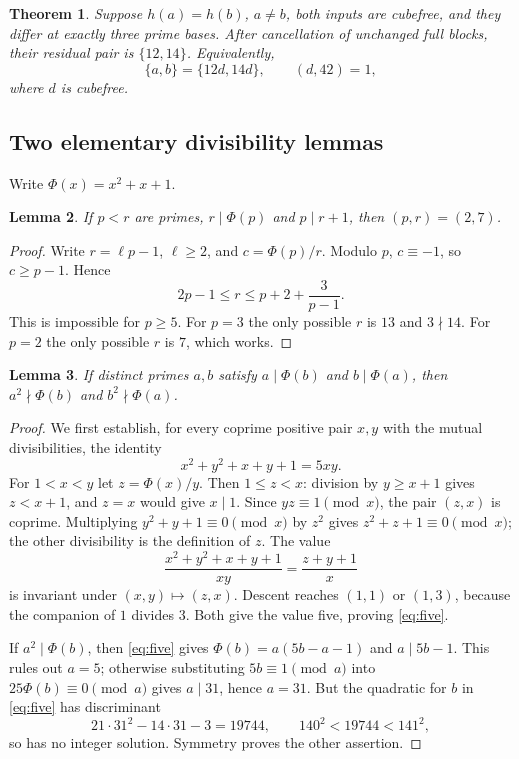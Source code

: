 \documentclass[11pt,a4paper]{article}
\newtheorem{theorem}{Theorem}[section]
\newtheorem{lemma}[theorem]{Lemma}
\theoremstyle{remark}
\begin{document}
\begin{theorem}\label{thm:three}
Suppose $h(a)=h(b)$, $a\ne b$, both inputs are cubefree, and they differ
at exactly three prime bases. After cancellation of unchanged full blocks,
their residual pair is $\{12,14\}$. Equivalently,
\[
 \{a,b\}=\{12d,14d\},\qquad (d,42)=1,
\]
where $d$ is cubefree.
\end{theorem}

\subsection{Two elementary divisibility lemmas}
Write $\Phi(x)=x^2+x+1$.
\begin{lemma}\label{lem:mixed}
If $p<r$ are primes, $r\mid\Phi(p)$ and $p\mid r+1$, then
$(p,r)=(2,7)$.
\end{lemma}
\begin{proof}
Write $r=\ell p-1$, $\ell\ge2$, and $c=\Phi(p)/r$.
Modulo $p$, $c\equiv-1$, so $c\ge p-1$. Hence
\[
 2p-1\le r\le p+2+\frac3{p-1}.
\]
This is impossible for $p\ge5$. For $p=3$ the only possible $r$ is $13$
and $3\nmid14$. For $p=2$ the only possible $r$ is $7$, which works.
\end{proof}

\begin{lemma}\label{lem:mutual}
If distinct primes $a,b$ satisfy $a\mid\Phi(b)$ and $b\mid\Phi(a)$,
then $a^2\nmid\Phi(b)$ and $b^2\nmid\Phi(a)$.
\end{lemma}
\begin{proof}
We first establish, for every coprime positive pair $x,y$ with the mutual
divisibilities, the identity
\begin{equation}\label{eq:five}
 x^2+y^2+x+y+1=5xy.
\end{equation}
For $1<x<y$ let $z=\Phi(x)/y$. Then $1\le z<x$: division by $y\ge x+1$
gives $z<x+1$, and $z=x$ would give $x\mid1$. Since $yz\equiv1\pmod x$,
the pair $(z,x)$ is coprime. Multiplying $y^2+y+1\equiv0\pmod x$ by
$z^2$ gives $z^2+z+1\equiv0\pmod x$; the other divisibility is the
definition of $z$. The value
\[
 \frac{x^2+y^2+x+y+1}{xy}=\frac{z+y+1}{x}
\]
is invariant under $(x,y)\mapsto(z,x)$. Descent reaches $(1,1)$ or $(1,3)$,
because the companion of $1$ divides $3$. Both give the value five, proving
\eqref{eq:five}.

If $a^2\mid\Phi(b)$, then \eqref{eq:five} gives
$\Phi(b)=a(5b-a-1)$ and $a\mid5b-1$. This rules out $a=5$; otherwise
substituting $5b\equiv1\pmod a$ into $25\Phi(b)\equiv0\pmod a$
gives $a\mid31$, hence $a=31$. But the quadratic for $b$ in
\eqref{eq:five} has discriminant
\[
 21\cdot31^2-14\cdot31-3=19744,
 \qquad 140^2<19744<141^2,
\]
so has no integer solution. Symmetry proves the other assertion.
\end{proof}
\end{document}
